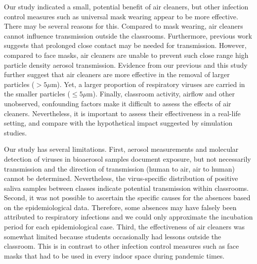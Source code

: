 \documentclass[fleqn,11pt]{wlscirep}
\begin{document}

Our study indicated a small, potential benefit of air cleaners, but other infection control measures such as universal mask wearing appear to be more effective\cite{Banholzer2023PLoSMed,Heinsohn2022,Gettings2021,Dharmadhikari2012AJRCCM,Leung2020NatMed,Milton2013PLoSPathogens}. There may be several reasons for this. Compared to \eg mask wearing, air cleaners cannot influence transmission outside the classrooms. Furthermore, previous work suggests that prolonged close contact may be needed for transmission\cite{Leung2020NatMed,Brankston2007LancetID}. However, compared to face masks, air cleaners are unable to prevent such close range high particle density aerosol transmission. Evidence from our previous\cite{Banholzer2023PLoSMed} and this study further suggest that air cleaners are more effective in the removal of larger particles ($>5\mu$m). Yet, a larger proportion of respiratory viruses are carried in the smaller particles ($\leq5\mu$m)\cite{Fennelly2020}. Finally, classroom activity, airflow and other unobserved, confounding factors make it difficult to assess the effects of air cleaners. Nevertheless, it is important to assess their effectiveness in a real-life setting, and compare with the hypothetical impact suggested by simulation studies\cite{Lindsley2021,Cortellessa2023Build}.



Our study has several limitations. First, aerosol measurements and molecular detection of viruses in bioaerosol samples document exposure, but not necessarily transmission and the direction of transmission (human to air, air to human) cannot be determined. Nevertheless, the virus-specific distribution of positive saliva samples between classes indicate potential transmission within classrooms. Second, it was not possible to ascertain the specific causes for the absences based on the epidemiological data. Therefore, some absences may have falsely been attributed to respiratory infections and we could only approximate the incubation period for each epidemiological case. Third, the effectiveness of air cleaners was somewhat limited because students occasionally had lessons outside the classroom. This is in contrast to other infection control measures such as face masks that had to be used in every indoor space during pandemic times.

\end{document}
